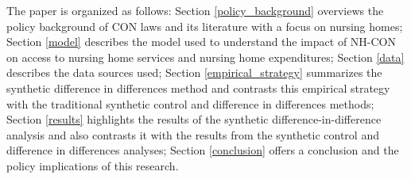 \documentclass[../Main.tex]{subfiles}
\begin{document}
The paper is organized as follows: Section \ref{policy_background} overviews the policy background of CON laws and its literature with a focus on nursing homes; Section \ref{model} describes the model used to understand the impact of  NH-CON on access to nursing home services and nursing home expenditures; Section \ref{data} describes the data sources used; Section \ref{empirical_strategy} summarizes the synthetic difference in differences method and contrasts this empirical strategy with the traditional synthetic control and difference in differences methods; Section \ref{results} highlights the results of the synthetic difference-in-difference analysis and also contrasts it with the results from the synthetic control and difference in differences analyses; Section \ref{conclusion} offers a conclusion and the policy implications of this research.
\end{document}
